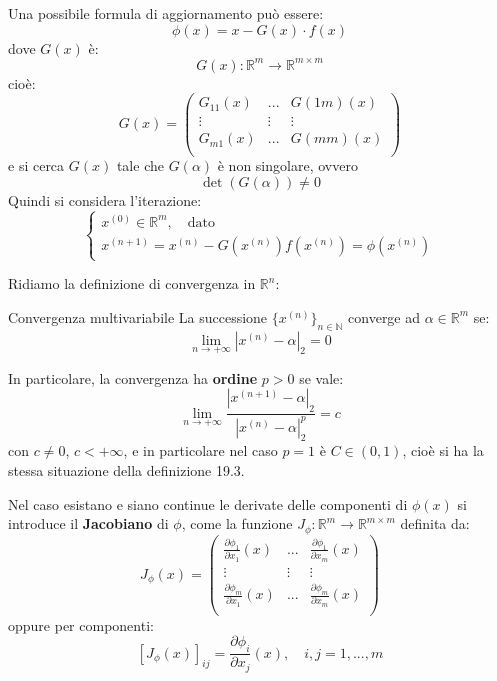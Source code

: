 \documentclass[a4paper,11pt]{article}
\begin{document}
Una possibile formula di aggiornamento può essere:
$$
\phi(x) = x - G(x) \cdot f(x)
$$
dove $G(x)$ è:
$$
G(x) : \mathbb{R}^m \rightarrow \mathbb{R}^{m \times m}
$$
cioè:
$$
G(x) =
\begin{pmatrix}
	G_{11}(x) & ... & G(1m)(x) \\
	\vdots & \vdots & \vdots \\
	G_{m1}(x) & ... & G(mm)(x) \\
\end{pmatrix}
$$
e si cerca $G(x)$ tale che $G(\alpha)$ è non singolare, ovvero 
$$
\det(G(\alpha)) \neq 0
$$
Quindi si considera l'iterazione:
\[
	\begin{cases}
		x^{(0)} \in \mathbb{R}^m, \quad \text{dato} \\
		x^{(n + 1)} = x^{(n)} - G(x^{(n)}) f(x^{(n)}) = \phi (x^{(n)})
	\end{cases}
\]

Ridiamo la definizione di convergenza in $\mathbb{R}^n$:
\begin{definition}{Convergenza multivariabile}
	La successione $\{x^{(n)}\}_{n \in \mathbb{N}}$ converge ad $\alpha \in \mathbb{R}^m$ se:
	$$
	\lim_{n \rightarrow + \infty} | x^{(n)} - \alpha|_2 = 0
	$$
\end{definition}

In particolare, la convergenza ha \textbf{ordine} $p > 0$ se vale:
$$
\lim_{n \rightarrow +\infty} \frac{|x^{(n + 1)} - \alpha|_2}{|x^{(n)} - \alpha|_2^p} = c 
$$
con $c \neq 0$, $c < +\infty$, e in particolare nel caso $p = 1$ è $C \in (0, 1)$, cioè si ha la stessa situazione della definizione 19.3.

\par\smallskip

Nel caso esistano e siano continue le derivate delle componenti di $\phi(x)$ si introduce il \textbf{Jacobiano} di $\phi$, come la funzione $J_\phi : \mathbb{R}^m \rightarrow \mathbb{R}^{m \times m}$ definita da:
$$
J_\phi(x) = 
\begin{pmatrix}
	\frac{\partial \phi_1}{\partial x_1}(x) & ... & \frac{\partial \phi_1}{\partial x_m}(x) \\
	\vdots & \vdots & \vdots \\
	\frac{\partial \phi_m}{\partial x_1}(x) & ... & \frac{\partial \phi_m}{\partial x_m}(x) \\
\end{pmatrix}
$$
oppure per componenti:
$$
[J_\phi(x)]_{ij} = \frac{\partial \phi_i}{\partial x_j} (x), \quad i, j = 1, ..., m
$$
\end{document}
